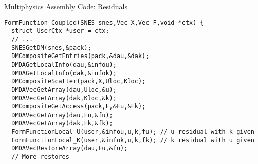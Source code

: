 \begin{frame}[fragile]{Multiphysics Assembly Code: Residuals}
\begin{verbatim}
FormFunction_Coupled(SNES snes,Vec X,Vec F,void *ctx) {
  struct UserCtx *user = ctx;
  // ...
  SNESGetDM(snes,&pack);
  DMCompositeGetEntries(pack,&dau,&dak);
  DMDAGetLocalInfo(dau,&infou);
  DMDAGetLocalInfo(dak,&infok);
  DMCompositeScatter(pack,X,Uloc,Kloc);
  DMDAVecGetArray(dau,Uloc,&u);
  DMDAVecGetArray(dak,Kloc,&k);
  DMCompositeGetAccess(pack,F,&Fu,&Fk);
  DMDAVecGetArray(dau,Fu,&fu);
  DMDAVecGetArray(dak,Fk,&fk);
  FormFunctionLocal_U(user,&infou,u,k,fu); // u residual with k given
  FormFunctionLocal_K(user,&infok,u,k,fk); // k residual with u given
  DMDAVecRestoreArray(dau,Fu,&fu);
  // More restores
\end{verbatim}
\end{frame}
